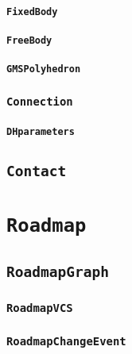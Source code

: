 \paragraph{\texttt{FixedBody}}

\paragraph{\texttt{FreeBody}}

\paragraph{\texttt{GMSPolyhedron}}

\subsubsection{\texttt{Connection}}

\paragraph{\texttt{DHparameters}}

\subsection{\texttt{Contact}}

\section{\texttt{Roadmap}}

\subsection{\texttt{RoadmapGraph}}

\subsubsection{\texttt{RoadmapVCS}}

\subsubsection{\texttt{RoadmapChangeEvent}}

